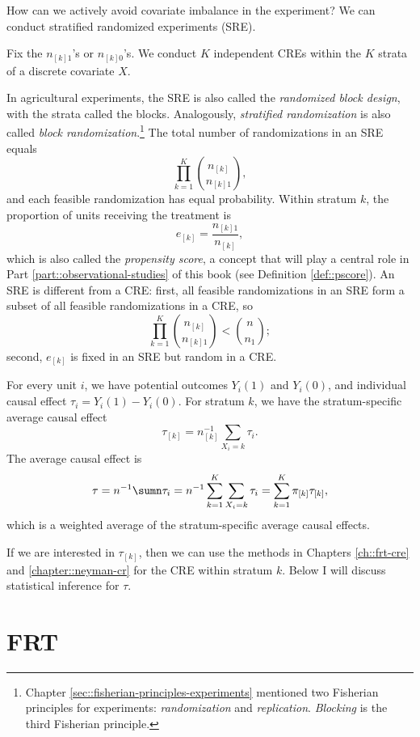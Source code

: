 How can we actively avoid covariate imbalance in the experiment? We can conduct stratified randomized experiments (SRE).

\begin{definition}[SRE]
\label{def::SRE}
Fix the $n_{[k]1}$'s or $n_{[k]0}$'s.
We conduct $K$ independent  CREs within the $K$ strata of a discrete covariate $X$.
\end{definition}

In agricultural experiments, the SRE is also called the {\it randomized block design}, with the strata called the blocks. Analogously, {\it stratified randomization} is also called {\it block randomization}.\footnote{
Chapter \ref{sec::fisherian-principles-experiments} mentioned two Fisherian principles for experiments: {\it randomization} and {\it replication}. {\it Blocking} is the third Fisherian principle. 
} The total number of randomizations in an SRE equals 
$$
\prod_{k=1}^K  \binom{  n_{[k]} }{  n_{[k]1} } ,
$$
and each feasible randomization has equal probability. Within stratum $k$, the proportion of units receiving the treatment is
$$
e_{[k]} = \frac{n_{[k]1}}{n_{[k]}},
$$
which is also called the {\it propensity score}, a concept that will play a central role in Part \ref{part::observational-studies} of this book (see Definition \ref{def::pscore}). 
An SRE is different from a CRE: first, all feasible randomizations in an SRE form a subset of all feasible randomizations in a CRE, so 
$$
\prod_{k=1}^K  \binom{  n_{[k]} }{  n_{[k]1} } < 
\binom{n}{n_1} ;
$$
second, $e_{[k]} $ is fixed in an SRE but random in a CRE.  


For every unit $i$, we have potential outcomes $Y_i(1)$ and $Y_i(0)$, and individual causal effect $\tau_i = Y_i(1) - Y_i(0) . $
For stratum $k$, we have the stratum-specific average causal effect
$$
\tau_{[k]} = n_{[k]}^{-1} \sum_{X_i   = k} \tau_i .
$$
The average causal effect is 
$$
\tau = n^{-1} \sumn \tau_i = n^{-1} \sum_{k=1}^K \sum_{X_i   = k} \tau_i =  \sum_{k=1}^K  \pi_{[k]}  \tau_{[k]},
$$
which is a weighted average of the stratum-specific average causal effects. 


If we are interested in $\tau_{[k]} $, then we can use the methods in Chapters \ref{ch::frt-cre} and \ref{chapter::neyman-cr} for the CRE within stratum $k$. Below I will discuss statistical inference for $\tau$. 


\section{FRT}
\label{sec::sre-frt}


